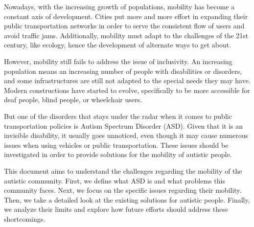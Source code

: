 
Nowadays, with the increasing growth of populations, mobility has become a constant axis of development. Cities put more and more effort in expanding their public transportation networks in order to serve the consistent flow of users and avoid traffic jams. Additionally, mobility must adapt to the challenges of the 21st century, like ecology, hence the development of alternate ways to get about.

However, mobility still fails to address the issue of inclusivity. An increasing population means an increasing number of people with disabilities or disorders, and some infrastructures are still not adapted to the special needs they may have. Modern constructions have started to evolve, specifically to be more accessible for deaf people, blind people, or wheelchair users.

But one of the disorders that stays under the radar when it comes to public transportation policies is Autism Spectrum Disorder (ASD). Given that it is an invisible disability, it usually goes unnoticed, even though it may cause numerous issues when using vehicles or public transportation. These issues should be investigated in order to provide solutions for the mobility of autistic people.

This document aims to understand the challenges regarding the mobility of the autistic community. First, we define what ASD is and what problems this community faces. Next, we focus on the specific issues regarding their mobility. Then, we take a detailed look at the existing solutions for autistic people. Finally, we analyze their limits and explore how future efforts should address these shortcomings.
